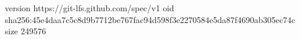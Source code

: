 version https://git-lfs.github.com/spec/v1
oid sha256:45e4daa7c5c8d9b7712be767fac94d598f3e2270584e5da87f4690ab305ec74c
size 249576
